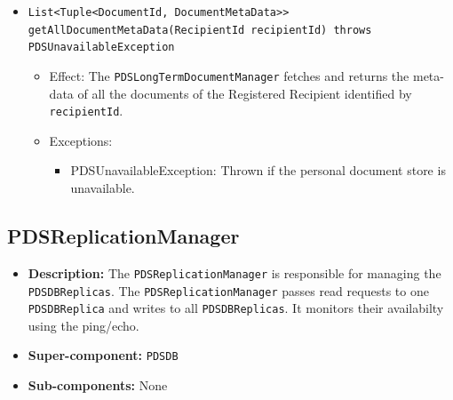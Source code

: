\documentclass[a4paper,10pt]{article}
\begin{document}
\begin{itemize}
\begin{itemize}
         \item \texttt{List<Tuple<DocumentId, DocumentMetaData>> getAllDocumentMetaData(RecipientId recipientId) throws PDSUnavailableException}
        \begin{itemize}
            \item Effect: The \texttt{PDSLongTermDocumentManager} fetches and returns the meta-data of all the documents of the Registered Recipient identified by \texttt{recipientId}.
            \item Exceptions:
            \begin{itemize}
                \item PDSUnavailableException: Thrown if the personal document store is unavailable.
            \end{itemize}
		\end{itemize}
         
    \end{itemize}
\end{itemize}



\subsection{PDSReplicationManager}
\begin{itemize}
    \item \textbf{Description:} The \texttt{PDSReplicationManager} is responsible for managing the \texttt{PDSDBReplicas}. The \texttt{PDSReplicationManager} passes read requests to one \texttt{PDSDBReplica} and  writes to all \texttt{PDSDBReplicas}. It monitors their availabilty using the ping/echo.
    \item \textbf{Super-component:} \texttt{PDSDB}
    \item \textbf{Sub-components:} None
\end{itemize}
\end{document}
